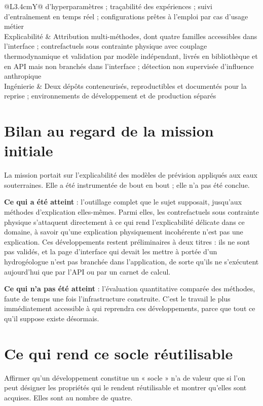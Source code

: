 \begin{table}[H]
\begin{tabularx}{\textwidth}{@{}L{3.4cm}Y@{}}
d'hyperparamètres ; traçabilité des expériences ; suivi d'entraînement en temps réel ;
configurations prêtes à l'emploi par cas d'usage métier \\
Explicabilité & Attribution multi-méthodes, dont quatre familles accessibles dans l'interface ;
contrefactuels sous contrainte physique avec couplage thermodynamique et validation par modèle
indépendant, livrés en bibliothèque et en API mais non branchés dans l'interface ; détection non
supervisée d'influence anthropique \\
Ingénierie & Deux dépôts conteneurisés, reproductibles et documentés pour la reprise ;
environnements de développement et de production séparés \\
\bottomrule
\end{tabularx}
\end{table}

\section{Bilan au regard de la mission initiale}

La mission portait sur l'explicabilité des modèles de prévision appliqués aux eaux souterraines.
Elle a été instrumentée de bout en bout ; elle n'a pas été conclue.

\textbf{Ce qui a été atteint} : l'outillage complet que le sujet supposait, jusqu'aux méthodes
d'explication elles-mêmes. Parmi elles, les contrefactuels sous contrainte physique s'attaquent
directement à ce qui rend l'explicabilité délicate dans ce domaine, à savoir qu'une explication
physiquement incohérente n'est pas une explication. Ces développements restent préliminaires à
deux titres : ils ne sont pas validés, et la page d'interface qui devait les mettre à portée d'un
hydrogéologue n'est pas branchée dans l'application, de sorte qu'ils ne s'exécutent aujourd'hui
que par l'API ou par un carnet de calcul.

\textbf{Ce qui n'a pas été atteint} : l'évaluation quantitative comparée des méthodes, faute de
temps une fois l'infrastructure construite. C'est le travail le plus immédiatement accessible à
qui reprendra ces développements, parce que tout ce qu'il suppose existe désormais.

\section{Ce qui rend ce socle réutilisable}

Affirmer qu'un développement constitue un « socle » n'a de valeur que si l'on peut désigner les
propriétés qui le rendent réutilisable et montrer qu'elles sont acquises. Elles sont au nombre
de quatre.

